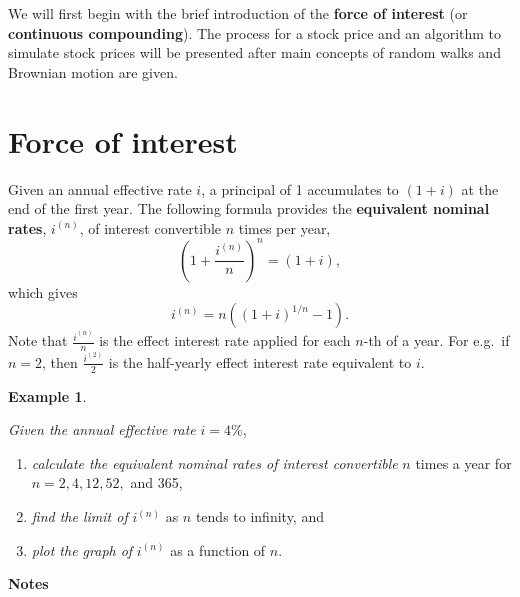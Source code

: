\documentclass[
]{book}
\theoremstyle{definition}
\theoremstyle{definition}
\newtheorem{example}{Example}[chapter]
\theoremstyle{definition}
\theoremstyle{definition}
\theoremstyle{remark}
\begin{document}
We will first begin with the brief introduction of the \textbf{force of
interest} (or \textbf{continuous compounding}). The process for a stock
price and an algorithm to simulate stock prices will be presented after
main concepts of random walks and Brownian motion are given.

\hypertarget{force-of-interest}{%
\section{Force of interest}\label{force-of-interest}}

Given an annual effective rate \(i\), a principal of 1 accumulates to
\((1 + i)\) at the end of the first year. The following formula provides
the \textbf{equivalent nominal rates}, \(i^{(n)}\), of interest convertible \(n\)
times per year, \[\left(1 + \frac{i^{(n)}}{n} \right)^n  = (1 + i),\]
which gives \[i^{(n)} = n\left( (1+ i)^{1/n} - 1  \right).\] Note that
\(\displaystyle{\frac{i^{(n)}}{n}}\) is the effect interest rate applied
for each \(n\)-th of a year. For e.g.~if \(n =2\), then
\(\displaystyle{\frac{i^{(2)}}{2}}\) is the half-yearly effect interest
rate equivalent to \(i\).

\begin{example}
\protect\hypertarget{exm:unlabeled-div-65}{}\label{exm:unlabeled-div-65}

\emph{Given the annual effective rate} \(i = 4\%\),

\begin{enumerate}
\def\labelenumi{\arabic{enumi}.}
\item
  \emph{calculate the equivalent nominal rates of interest convertible} \(n\)
  times a year for \(n = 2,4,12, 52,\) and 365,
\item
  \emph{find the limit of} \(i^{(n)}\) as \(n\) tends to infinity, and
\item
  \emph{plot the graph of} \(i^{(n)}\) as a function of \(n\).
\end{enumerate}

\end{example}

\textbf{Notes}
\end{document}
